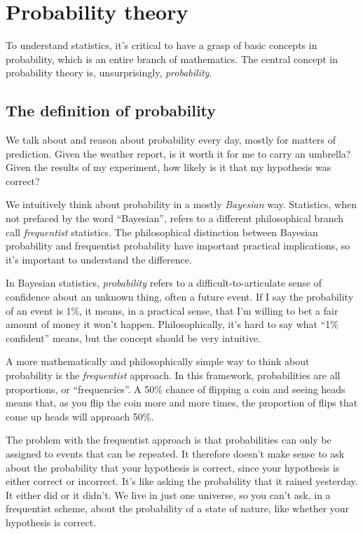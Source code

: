 
\chapter{Probability theory}
\label{chapter:probability}

To understand statistics, it's critical to have a grasp of basic concepts in
probability, which is an entire branch of mathematics. The central concept in
probability theory is, unsurprisingly, \emph{probability}.

\section{The definition of probability}

We talk about and reason about probability every day, mostly for matters of
prediction. Given the weather report, is it worth it for me to carry an
umbrella? Given the results of my experiment, how likely is it that my
hypothesis was correct?

We intuitively think about probability in a mostly \emph{Bayesian} way.
Statistics, when not prefaced by the word ``Bayesian'', refers to a different
philosophical branch call \emph{frequentist} statistics. The philosophical
distinction between Bayesian probability and frequentist probability have
important practical implications, so it's important to understand the
difference.

In Bayesian statistics, \emph{probability} refers to a difficult-to-articulate
sense of confidence about an unknown thing, often a future event. If I say the
probability of an event is 1\%, it means, in a practical sense, that I'm
willing to bet a fair amount of money it won't happen. Philosophically, it's
hard to say what ``1\% confident'' means, but the concept should be very
intuitive.

A more mathematically and philosophically simple way to think about
probability is the \emph{frequentist} approach. In this framework,
probabilities are all proportions, or ``frequencies''. A 50\% chance of
flipping a coin and seeing heads means that, as you flip the coin more and
more times, the proportion of flips that come up heads will approach 50\%.

The problem with the frequentist approach is that probabilities can only be
assigned to events that can be repeated. It therefore doesn't make sense to
ask about the probability that your hypothesis is correct, since your
hypothesis is either correct or incorrect. It's like asking the probability
that it rained yesterday. It either did or it didn't. We live in just one
universe, so you can't ask, in a frequentist scheme, about the probability of
a state of nature, like whether your hypothesis is correct.

